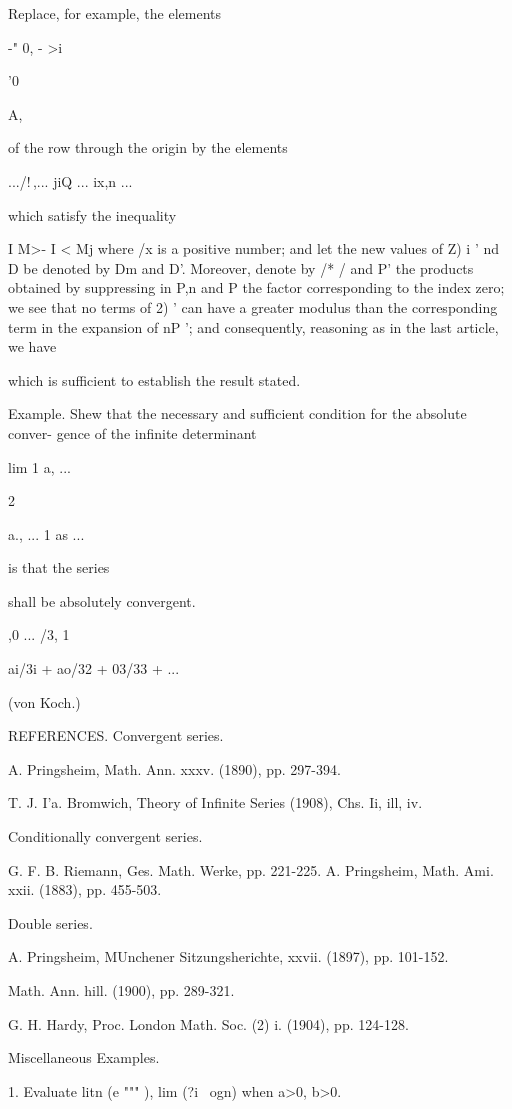 Replace, for example, the elements

-" 0, - >i

'0

A,

of the row through the origin by the elements

.../!\,,... jiQ ... ix,n ...

which satisfy the inequality

I M>- I < Mj where /x is a positive number; and let the new values of
Z) i ' nd D be denoted by Dm and D'. Moreover, denote by /* / and P'
the products obtained by suppressing in P,n and P the factor
corresponding to the index zero; we see that no terms of 2) ' can
have a greater modulus than the corresponding term in the expansion of
nP '; and consequently, reasoning as in the last article, we have

which is sufficient to establish the result stated.

Example. Shew that the necessary and sufficient condition for the
absolute conver- gence of the infinite determinant

lim 1 a, ...

 2

a., ... 1 as ...

is that the series

shall be absolutely convergent.

,0 ... /3, 1

ai/3i + ao/32 + 03/33 + ...

(von Koch.)

%
%

REFERENCES. Convergent series.

A. Pringsheim, Math. Ann. xxxv. (1890), pp. 297-394.

T. J. I'a. Bromwich, Theory of Infinite Series (1908), Chs. Ii, ill,
iv.

Conditionally convergent series.

G. F. B. Riemann, Ges. Math. Werke, pp. 221-225. A. Pringsheim, Math.
Ami. xxii. (1883), pp. 455-503.

Double series.

A. Pringsheim, MUnchener Sitzungsherichte, xxvii. (1897), pp. 101-152.

    Math. Ann. hill. (1900), pp. 289-321.

G. H. Hardy, Proc. London Math. Soc. (2) i. (1904), pp. 124-128.

Miscellaneous Examples.

1. Evaluate litn (e """ ), lim (?i~ ogn) when a>0, b>0.

